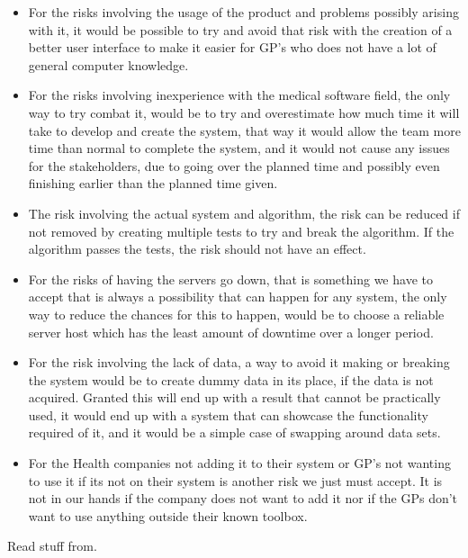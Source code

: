\begin{itemize}
	\item For the risks involving the usage of the product and problems possibly arising with it, it would be possible to try and avoid that risk with the creation of a better user interface to make it easier for GP’s who does not have a lot of general computer knowledge. 
	\item For the risks involving inexperience with the medical software field, the only way to try combat it, would be to try and overestimate how much time it will take to develop and create the system, that way it would allow the team more time than normal to complete the system, and it would not cause any issues for the stakeholders, due to going over the planned time and possibly even finishing earlier than the planned time given.
	\item The risk involving the actual system and algorithm, the risk can be reduced if not removed by creating multiple tests to try and break the algorithm. If the algorithm passes the tests, the risk should not have an effect.
	\item For the risks of having the servers go down, that is something we have to accept that is always a possibility that can happen for any system, the only way to reduce the chances for this to happen, would be to choose a reliable server host which has the least amount of downtime over a longer period.
	\item For the risk involving the lack of data, a way to avoid it making or breaking the system would be to create dummy data in its place, if the data is not acquired. Granted this will end up with a result that cannot be practically used, it would end up with a system that can showcase the functionality required of it, and it would be a simple case of swapping around data sets.
	\item For the Health companies not adding it to their system or GP’s not wanting to use it if its not on their system is another risk we just must accept. It is not in our hands if the company does not want to add it nor if the GPs don’t want to use anything outside their known toolbox.
\end{itemize}





Read stuff from\cite{Larson2021}.
